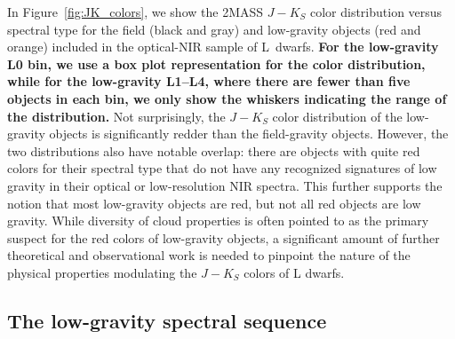 \documentclass[12pt]{aastex6}
\begin{document}
In Figure~\ref{fig:JK_colors}, we show the 2MASS $J-K_S$ color distribution versus spectral type for the field (black and gray) and low-gravity objects (red and orange) included in the optical-NIR sample of L~dwarfs.
\textbf{For the low-gravity L0 bin, we use a box plot representation for the color distribution, while for the low-gravity L1--L4, where there are fewer than five objects in each bin, we only show the whiskers indicating the range of the distribution.}
Not surprisingly, the $J-K_S$ color distribution of the low-gravity objects is significantly redder than the field-gravity objects.
However, the two distributions also have notable overlap: there are objects with quite red colors for their spectral type that do not have any recognized signatures of low gravity in their optical or low-resolution NIR spectra.
This further supports the notion that most low-gravity objects are red, but not all red objects are low gravity.
While diversity of cloud properties is often pointed to as the primary suspect for the red colors of low-gravity objects, a significant amount of further theoretical and observational work is needed to pinpoint the nature of the physical properties modulating the $J-K_S$ colors of L dwarfs.

\clearpage


\subsection{The low-gravity spectral sequence}
\end{document}
